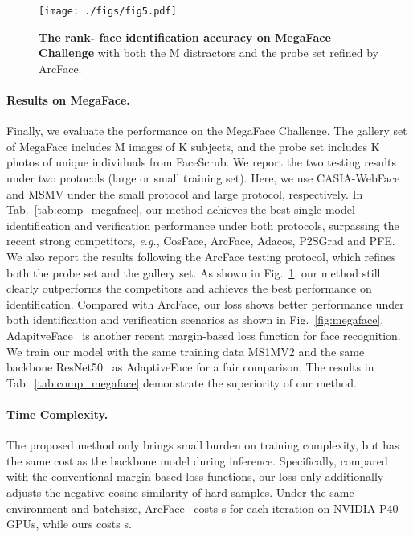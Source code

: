 \documentclass[10pt,twocolumn,letterpaper]{article}
\def\figvspace{{\vspace{-2mm}}}
\begin{document}
\begin{figure}[t!]
  \centering
  \texttt{[image: ./figs/fig5.pdf]}
  \caption{\small \textbf{The rank- face identification accuracy on MegaFace Challenge } with both the M distractors and the probe set refined by ArcFace.
  }
  \label{fig:megface_result}
  \figvspace
\end{figure}


\paragraph{Results on MegaFace.}
Finally, we evaluate the performance on the MegaFace Challenge.
The gallery set of MegaFace includes M images of K subjects, and the probe set includes K photos of  unique individuals from FaceScrub.
We report the two testing results under two protocols (large or small training set).
Here, we use CASIA-WebFace and MSMV under the small protocol and large protocol, respectively.
In Tab.~\ref{tab:comp_megaface}, our method achieves the best single-model identification and verification performance under both protocols, surpassing the recent strong competitors, \textit{e.g.}, CosFace, ArcFace, Adacos, P2SGrad and PFE.
We also report the results following the ArcFace testing protocol, which refines both the probe set and the gallery set.
As shown in Fig.~\ref{fig:megface_result}, our method still clearly outperforms the competitors and achieves the best performance on identification.
Compared with ArcFace, our loss shows better performance under both identification and verification scenarios as shown in Fig.~\ref{fig:megaface}. AdapitveFace~\cite{liu2019adaptiveface} is another recent margin-based loss function for face recognition. We train our model with the same training data MS1MV2 and the same backbone ResNet50~\cite{deng2018arcface} as AdaptiveFace for a fair comparison. The results in Tab.~\ref{tab:comp_megaface} demonstrate the superiority of our method.




\paragraph{Time Complexity.}
The proposed method only brings small burden on training complexity, but has the same cost as the backbone model during inference. Specifically, compared with the conventional margin-based loss functions, our loss only additionally adjusts the negative cosine similarity of hard samples. Under the same environment and batchsize, ArcFace~\cite{deng2018arcface} costs s for each iteration on NVIDIA P40 GPUs, while ours costs s.
\end{document}
